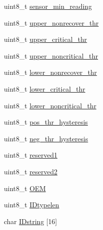 \begin{DoxyCompactItemize}
uint8\-\_\-t \hyperlink{structSDR__type__01h__t_a64e564e58ae281140f9831301eaaa01e}{sensor\-\_\-min\-\_\-reading}
\item 
uint8\-\_\-t \hyperlink{structSDR__type__01h__t_a1a90d55b827420ba0c40706923f9b1a3}{upper\-\_\-nonrecover\-\_\-thr}
\item 
uint8\-\_\-t \hyperlink{structSDR__type__01h__t_ac3ebe764adbc5470f3fccb7ea4ae3f57}{upper\-\_\-critical\-\_\-thr}
\item 
uint8\-\_\-t \hyperlink{structSDR__type__01h__t_aaca8ed979cdd5f27242eb009a23e0ea6}{upper\-\_\-noncritical\-\_\-thr}
\item 
uint8\-\_\-t \hyperlink{structSDR__type__01h__t_abb39cbe60211beb9390de9cd40578a75}{lower\-\_\-nonrecover\-\_\-thr}
\item 
uint8\-\_\-t \hyperlink{structSDR__type__01h__t_a84b2767d9bff900905294728c5008d95}{lower\-\_\-critical\-\_\-thr}
\item 
uint8\-\_\-t \hyperlink{structSDR__type__01h__t_a0502c2a5e0f173f1afad6e4b2f12b940}{lower\-\_\-noncritical\-\_\-thr}
\item 
uint8\-\_\-t \hyperlink{structSDR__type__01h__t_a8a34540a39081128bc74ff7933bd82d5}{pos\-\_\-thr\-\_\-hysteresis}
\item 
uint8\-\_\-t \hyperlink{structSDR__type__01h__t_ab131b2af4c6a00a7911b81cf73ae1650}{neg\-\_\-thr\-\_\-hysteresis}
\item 
uint8\-\_\-t \hyperlink{structSDR__type__01h__t_a487b8d3a4de358024b053fd21b84a6ea}{reserved1}
\item 
uint8\-\_\-t \hyperlink{structSDR__type__01h__t_acf490e9416250a4bdb93fe2eefcfede5}{reserved2}
\item 
uint8\-\_\-t \hyperlink{structSDR__type__01h__t_a42024db1e61c6d4c8366ab26445c9a85}{O\-E\-M}
\item 
uint8\-\_\-t \hyperlink{structSDR__type__01h__t_a585637fb08113a1428f9532a60b16d92}{I\-Dtypelen}
\item 
char \hyperlink{structSDR__type__01h__t_ad8158ad2cd80ed145929f51cbeed9d25}{I\-Dstring} \mbox{[}16\mbox{]}
\end{DoxyCompactItemize}


